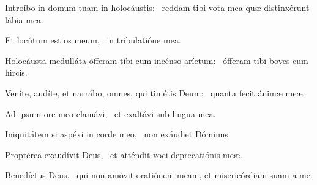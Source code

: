
\item Introíbo in domum tuam in holocáustis:~\psstar{} reddam tibi vota mea quæ distinxérunt lábia mea.

\item Et locútum est os meum,~\psstar{} in tribulatióne mea.

\item Holocáusta medulláta ófferam tibi cum incénso aríetum:~\psstar{} ófferam tibi boves cum hircis.

\item Veníte, audíte, et narrábo, omnes, qui timétis Deum:~\psstar{} quanta fecit ánimæ meæ.

\item Ad ipsum ore meo clamávi,~\psstar{} et exaltávi sub lingua mea.

\item Iniquitátem si aspéxi in corde meo,~\psstar{} non exáudiet Dóminus.

\item Proptérea exaudívit Deus,~\psstar{} et atténdit voci deprecatiónis meæ.

\item Benedíctus Deus,~\psstar{} qui non amóvit oratiónem meam, et misericórdiam suam a me.